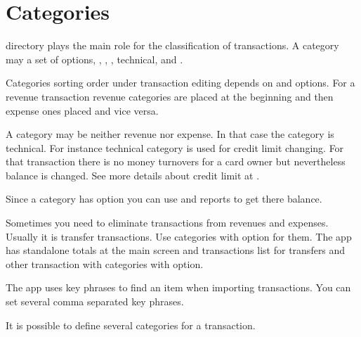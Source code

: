\documentclass[a4paper,10pt,english]{sphinxmanual}
\begin{document}
\noindent{}

\noindent{}

\noindent{}


\section{Categories}
\label{\detokenize{directories:categories}}
 directory plays the main role for the classification of transactions.
A category may a set of options,
, , ,
technical,  and  .

Categories sorting order under transaction editing depends on
 and  options. For a revenue transaction
revenue categories are placed at the beginning and then expense ones placed and vice versa.

A category may be neither revenue nor expense. In that case the category is technical. For instance
technical category is used for credit limit changing. For that transaction there is no money turnovers
for a card owner but nevertheless balance is changed. See more details about credit limit at
.

Since a category has  option you can use  and 
reports to get there balance.

Sometimes you need to eliminate transactions from revenues and expenses. Usually it is
transfer transactions. Use categories with  option for them.
The app has standalone totals at the main screen and transactions list for transfers and other transaction with
categories with  option.

The app uses key phrases to find an item when importing transactions. You can set several
comma separated key phrases.

It is possible to define several categories for a transaction.
\end{document}

